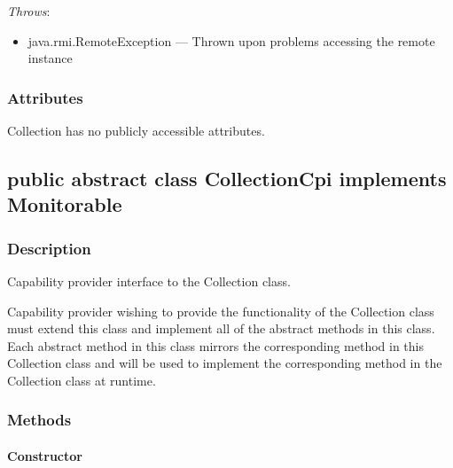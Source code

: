 \documentclass[$Date: 2003/06/26 19:29:31 $]{glabarticle}
\begin{document}
 \textit{Throws}:
 \begin{itemize}
 \item[] java.rmi.RemoteException --- Thrown upon problems accessing the remote instance 
 \end{itemize}


\subsubsection{Attributes}

Collection has no publicly accessible attributes.


\newpage

\subsection{public abstract class CollectionCpi implements Monitorable}


\subsubsection{Description}

Capability provider interface to the Collection class.

Capability provider wishing to provide the functionality of the Collection class must extend 
this class and implement all of the abstract methods in this class. Each abstract method in this class 
mirrors the corresponding method in this Collection class and will be used to implement 
the corresponding method in the Collection class at runtime. 


\subsubsection{Methods}

\paragraph{Constructor}
\end{document}

